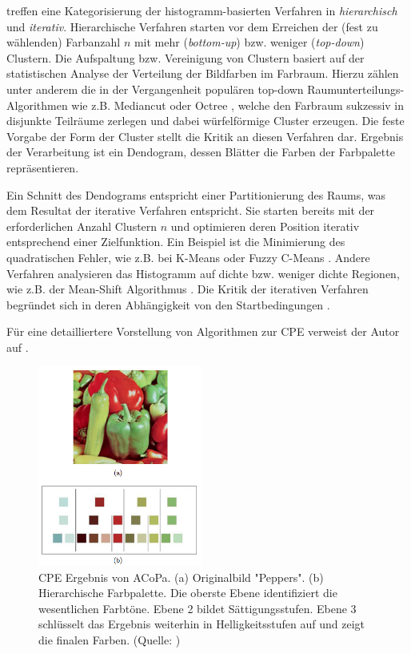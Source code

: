 \citet{categorization} treffen eine Kategorisierung der histogramm-basierten Verfahren in \emph{hierarchisch} und \emph{iterativ}. Hierarchische Verfahren starten vor dem Erreichen der (fest zu wählenden) Farbanzahl $n$ mit mehr (\emph{bottom-up}) bzw. weniger (\emph{top-down}) Clustern. Die Aufspaltung bzw. Vereinigung von Clustern basiert auf der statistischen Analyse der Verteilung der Bildfarben im Farbraum. Hierzu zählen unter anderem die in der Vergangenheit populären top-down Raumunterteilungs-Algorithmen wie z.B. Mediancut \citep{mediancut} oder Octree \citep{octree}, welche den Farbraum sukzessiv in disjunkte Teilräume zerlegen und dabei würfelförmige Cluster erzeugen. Die feste Vorgabe der Form der Cluster stellt die Kritik an diesen Verfahren dar. Ergebnis der Verarbeitung ist ein Dendogram, dessen Blätter die Farben der Farbpalette repräsentieren.

Ein Schnitt des Dendograms entspricht einer Partitionierung des Raums, was dem Resultat der iterative Verfahren entspricht.  Sie starten bereits mit der erforderlichen Anzahl Clustern $n$ und optimieren deren Position iterativ entsprechend einer Zielfunktion. Ein Beispiel ist die Minimierung des quadratischen Fehler, wie z.B. bei K-Means \citep{kmeans, kmeanshsi} oder Fuzzy C-Means \citep{fuccycmeans}. Andere Verfahren analysieren das Histogramm auf dichte bzw. weniger dichte Regionen, wie z.B. der Mean-Shift Algorithmus \citep{meanshift}. Die Kritik der iterativen Verfahren begründet sich in deren Abhängigkeit von den Startbedingungen \citep{acopa}.

Für eine detailliertere Vorstellung von Algorithmen zur CPE verweist der Autor auf \citet{categorization2}.

\begin{figure}[h]
\centering
\includegraphics[width=0.48\textwidth]{img/peppers.png}
\caption{CPE Ergebnis von ACoPa. (a) Originalbild "Peppers". (b) Hierarchische Farbpalette. Die oberste Ebene identifiziert die wesentlichen Farbtöne. Ebene 2 bildet Sättigungsstufen. Ebene 3 schlüsselt das Ergebnis weiterhin in Helligkeitsstufen auf und zeigt die finalen Farben. (Quelle: \citep{acopa})}
\label{fig:peppers}
\end{figure}

